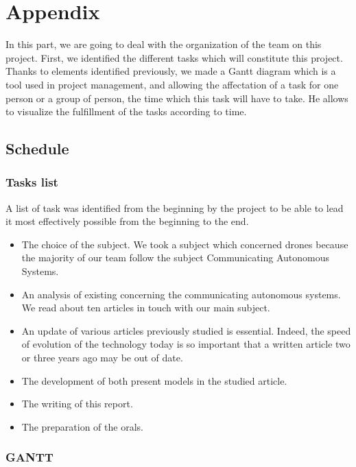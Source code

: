 \appendix

\setcounter{chapter}{0}

\part{Appendix}

In this part, we are going to deal with the organization of the team on this project. First, we identified the different tasks which will constitute this project. Thanks to elements identified previously, we made a Gantt diagram which is a tool used in project management, and allowing the affectation of a task for one person or a group of person, the time which this task will have to take. He allows to visualize the fulfillment of the tasks according to time.

\chapter{Schedule}

\section{Tasks list}

A list of task was identified from the beginning by the project to be able to lead it most effectively possible from the beginning to the end.

\begin{itemize}
\item The choice of the subject. We took a subject which concerned drones because the majority of our team follow the subject Communicating Autonomous Systems.
\item An analysis of existing concerning the communicating autonomous systems. We read about ten articles in touch with our main subject.
\item An update of various articles previously studied is essential. Indeed, the speed of evolution of the technology today is so important that a written article two or three years ago may be out of date.
\item The development of both present models in the studied article.
\item The writing of this report.
\item The preparation of the orals.
\end{itemize}

\newpage
\section{GANTT}

